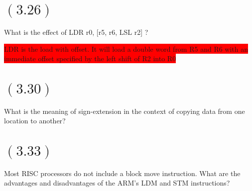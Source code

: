 \documentclass[letterpaper,12pt,titlepage]{article}
\begin{document}
\section*{$(3.26)$} What is the effect of LDR r0, [r5, r6, LSL r2] ?

\begin{mdframed}[style=MyFrame]
\colorbox{red}{LDR is the load with offset. It will load a double word from R5 and R6 with an }\\\colorbox{red} {immediate offset specified by the left shift of R2 into R0}
\end{mdframed}

\section*{$(3.30)$} What is the meaning of sign-extension in the context of copying data from one location to another?

\begin{mdframed}[style=MyFrame]
\end{mdframed}

\section*{$(3.33)$} Most RISC processors do not include a block move instruction. What are the advantages and disadvantages of the ARM's LDM and STM instructions?

\begin{mdframed}[style=MyFrame]
\end{mdframed}

\newpage
\end{document}
